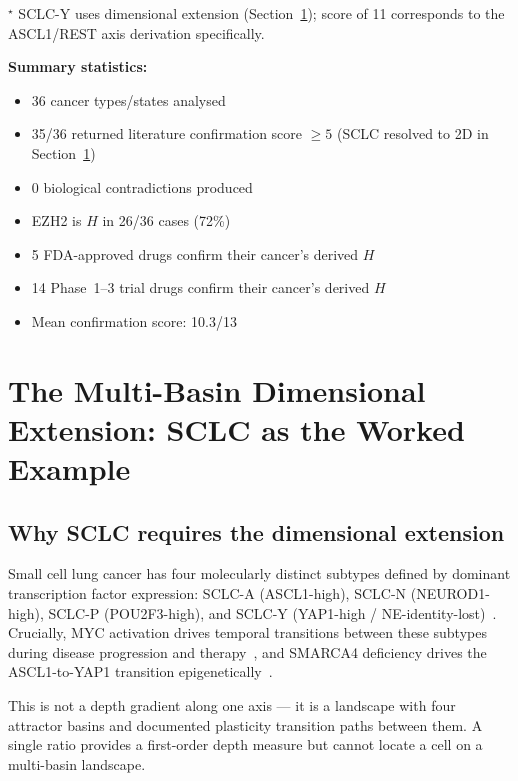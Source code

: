 \documentclass[11pt, a4paper]{article}
\begin{document}
\noindent
$^\star$ SCLC-Y uses dimensional extension
(Section~\ref{sec:sclcy}); score of 11 corresponds
to the ASCL1/REST axis derivation specifically.

\medskip
\textbf{Summary statistics:}
\begin{itemize}[noitemsep]
    \item 36 cancer types/states analysed
    \item 35/36 returned literature confirmation
          score $\geq 5$ (SCLC resolved to 2D in
          Section~\ref{sec:sclcy})
    \item 0 biological contradictions produced
    \item EZH2 is $H$ in 26/36 cases (72\%)
    \item 5 FDA-approved drugs confirm their
          cancer's derived $H$
    \item 14 Phase~1--3 trial drugs confirm their
          cancer's derived $H$
    \item Mean confirmation score: 10.3/13
\end{itemize}

\section{The Multi-Basin Dimensional Extension:
         SCLC as the Worked Example}
\label{sec:sclcy}

\subsection{Why SCLC requires the dimensional extension}

Small cell lung cancer has four molecularly distinct subtypes
defined by dominant transcription factor expression:
SCLC-A (ASCL1-high), SCLC-N (NEUROD1-high),
SCLC-P (POU2F3-high), and SCLC-Y (YAP1-high /
NE-identity-lost)~\cite{rudin2019}. Crucially, MYC
activation drives temporal transitions between these
subtypes during disease progression and
therapy~\cite{ireland2020}, and SMARCA4 deficiency drives
the ASCL1-to-YAP1 transition
epigenetically~\cite{augert2024}.

This is not a depth gradient along one axis --- it is a
landscape with four attractor basins and documented
plasticity transition paths between them. A single ratio
provides a first-order depth measure but cannot locate
a cell on a multi-basin landscape.
\end{document}
